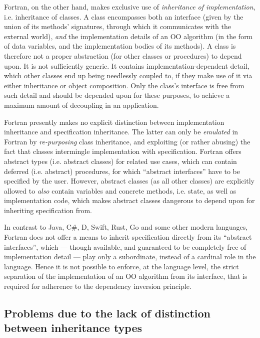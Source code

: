 \documentclass[11pt,oneside]{article}
\begin{document}
Fortran, on the other hand, makes exclusive use of \emph{inheritance
  of implementation}, i.e. inheritance of classes. A class encompasses
both an interface (given by the union of its methods' signatures,
through which it communicates with the external world), \emph{and} the
implementation details of an OO algorithm (in the form of data
variables, and the implementation bodies of its methods). A class is
therefore not a proper abstraction (for other classes or procedures)
to depend upon. It is not sufficiently generic. It contains
implementation-dependent detail, which other classes end up being
needlessly coupled to, if they make use of it via either inheritance
or object composition. Only the class's interface is free from such
detail and should be depended upon for these purposes, to achieve a
maximum amount of decoupling in an application.

Fortran presently makes no explicit distinction between implementation
inheritance and specification inheritance. The latter can only be
\emph{emulated} in Fortran by \emph{re-purposing} class inheritance,
and exploiting (or rather abusing) the fact that classes intermingle
implementation with specification. Fortran offers abstract types
(i.e. abstract classes) for related use cases, which can contain
deferred (i.e. abstract) procedures, for which ``abstract interfaces''
have to be specified by the user. However, abstract classes (as all
other classes) are explicitly allowed to \emph{also} contain variables
and concrete methods, i.e. state, as well as implementation code,
which makes abstract classes dangerous to depend upon for inheriting
specification from.

In contrast to Java, C\#, D, Swift, Rust, Go and some other modern
languages, Fortran does not offer a means to inherit specification
directly from its ``abstract interfaces'', which --- though available,
and guaranteed to be completely free of implementation detail --- play
only a subordinate, instead of a cardinal role in the language. Hence
it is not possible to enforce, at the language level, the strict
separation of the implementation of an OO algorithm from its
interface, that is required for adherence to the dependency inversion
principle.

\subsection{Problems due to the lack of distinction between inheritance types}
\label{sect:problems}
\end{document}

